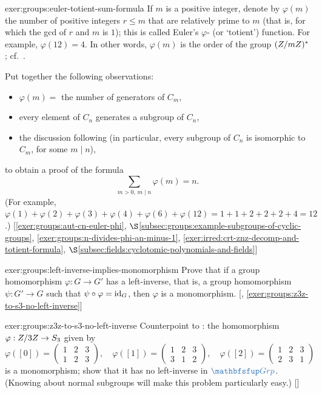 \begin{exer}{\exerused}{exer:groups:euler-totient-sum-formula}
  If $m$ is a positive integer, denote by $\varphi(m)$ the number of
  positive integers $r \leq m$ that are relatively prime to $m$ (that
  is, for which the gcd of $r$ and $m$ is $1$); this is called Euler's
  $\varphi$- (or `totient') function. For example, $\varphi(12) =
  4$. In other words, $\varphi(m)$ is the order of the group
  $(Z/mZ)^*$; cf.\ .

  Put together the following observations:
  \begin{itemize}
  \item $\varphi(m) = $ the number of generators of $C_m$,
  \item every element of $C_n$ generates a subgroup of $C_n$,
  \item the discussion following 
    (in particular, every subgroup of $C_n$ is isomorphic to $C_m$,
    for some $m \mid n$),
  \end{itemize}
  to obtain a proof of the formula
  \[
    \sum_{m>0,\, m\mid n} \varphi(m) = n.
  \]
  (For example,
  $\varphi(1)+\varphi(2)+\varphi(3)+\varphi(4)+\varphi(6)+\varphi(12)
  = 1+1+2+2+2+4 = 12$.) [\ref{exer:groups:aut-cn-euler-phi},
  $\S$\ref{subsec:groups:example-subgroups-of-cyclic-groups},
  \ref{exer:groups:n-divides-phi-an-minus-1},
  \ref{exer:irred:crt-znz-decomp-and-totient-formula},
  $\S$\ref{subsec:fields:cyclotomic-polynomials-and-fields}]
\end{exer}
\begin{exer}{\exerused}{exer:groups:left-inverse-implies-monomorphism}
  Prove that if a group homomorphism $\varphi : G \to G'$ has a
  left-inverse, that is, a group homomorphism $\psi : G' \to G$ such
  that $\psi \circ \varphi = \operatorname{id}_G$, then $\varphi$ is a monomorphism.
  [,
  \ref{exer:groups:z3z-to-s3-no-left-inverse}]
\end{exer}
\begin{exer}{\exerused}{exer:groups:z3z-to-s3-no-left-inverse}
  Counterpoint to
  : the
  homomorphism $\varphi : Z/3Z \to S_3$ given by
  \[
    \varphi([0]) = \begin{pmatrix}1&2&3\\1&2&3\end{pmatrix}, \quad
    \varphi([1]) = \begin{pmatrix}1&2&3\\3&1&2\end{pmatrix}, \quad
    \varphi([2]) = \begin{pmatrix}1&2&3\\2&3&1\end{pmatrix}
  \]
  is a monomorphism; show that it has no left-inverse in
  $\categ{Grp}$.  (Knowing about normal subgroups will make this
  problem particularly easy.) []
\end{exer}

